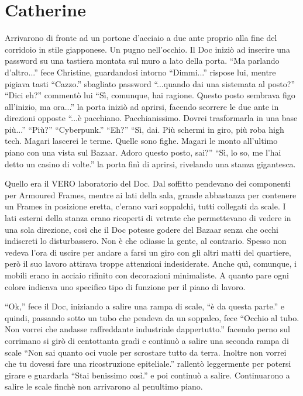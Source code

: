   \section*{Catherine}

    Arrivarono di fronte ad un portone d'acciaio a due ante proprio alla fine del corridoio in stile giapponese. Un
    pugno nell'occhio. Il Doc iniziò ad inserire una password su una tastiera montata sul muro a lato della porta.
    ``Ma parlando d'altro...'' fece Christine, guardandosi intorno ``Dimmi...'' rispose lui, mentre pigiava tasti
    ``Cazzo.'' sbagliato password ``...quando dai una sistemata al posto?'' ``Dici eh?'' commentò lui ``Sì, comunque,
    hai ragione. Questo posto sembrava figo all'inizio, ma ora...'' la porta iniziò ad aprirsi, facendo scorrere le due
    ante in direzioni opposte ``...è pacchiano. Pacchianissimo. Dovrei trasformarla in una base più...'' ``Più?''
    ``Cyberpunk.'' ``Eh?'' ``Sì, dai. Più schermi in giro, più roba high tech. Magari lascerei le terme. Quelle sono
    fighe. Magari le monto all'ultimo piano con una vista sul Bazaar. Adoro questo posto, sai?'' ``Sì, lo so, me l'hai
    detto un casino di volte.'' la porta finì di aprirsi, rivelando una stanza gigantesca.

    Quello era il VERO laboratorio del Doc. Dal soffitto pendevano dei componenti per Armoured Frames, mentre ai lati
    della sala, grande abbastanza per contenere un Frames in posizione eretta, c'erano vari soppalchi, tutti collegati
    da scale. I lati esterni della stanza erano ricoperti di vetrate che permettevano di vedere in una sola direzione,
    così che il Doc potesse godere del Bazaar senza che occhi indiscreti lo disturbassero. Non è che odiasse la gente,
    al contrario. Spesso non vedeva l'ora di uscire per andare a farsi un giro con gli altri matti del quartiere, però
    il suo lavoro attirava troppe attenzioni indesiderate. Anche quì, comunque, i mobili erano in acciaio rifinito con
    decorazioni minimaliste. A quanto pare ogni colore indicava uno specifico tipo di funzione per il piano di lavoro.

    ``Ok,'' fece il Doc, iniziando a salire una rampa di scale, ``è da questa parte.'' e quindi, passando sotto un tubo
    che pendeva da un soppalco, fece ``Occhio al tubo. Non vorrei che andasse raffreddante industriale dappertutto.''
    facendo perno sul corrimano si girò di centottanta gradi e continuò a salire una seconda rampa di scale ``Non sai
    quanto oci vuole per scrostare tutto da terra. Inoltre non vorrei che tu dovessi fare una ricostruzione
    epiteliale.'' rallentò leggermente per potersi girare e guardarla ``Stai benissimo così.'' e poi continuò a salire.
    Continuarono a salire le scale finchè non arrivarono al penultimo piano.

